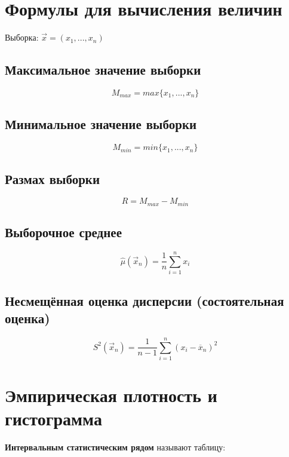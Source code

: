 \section{Формулы для вычисления величин}
Выборка:  $\vec{x} = (x_1, ..., x_n) $

\subsection{Максимальное значение выборки}
\begin{equation*}
	M_{max} = max\{x_1, ..., x_n\}
\end{equation*}

\subsection{Минимальное значение выборки}
\begin{equation*}
	M_{min} = min\{x_1, ..., x_n\}
\end{equation*}

\subsection{Размах выборки}
\begin{equation*}
	R = M_{max} - M_{min}
\end{equation*}

\subsection{Выборочное среднее}
\begin{equation*}
	\hat\mu(\vec x_n) = \frac 1n \sum_{i=1}^n x_i
\end{equation*}

\subsection{Несмещённая оценка дисперсии (состоятельная оценка)}
\begin{equation*}
	S^2(\vec x_n) = \frac 1{n-1} \sum_{i=1}^n (x_i-\overline x_n)^2
\end{equation*}


\section{Эмпирическая плотность и гистограмма}
\textbf{Интервальным статистическим рядом} называют таблицу:  \\  

